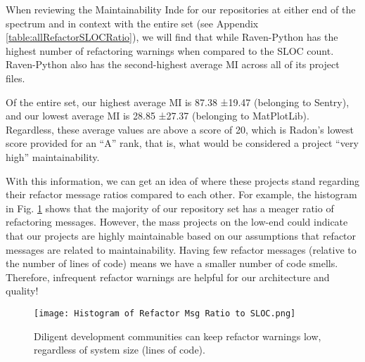 

When reviewing the Maintainability Inde for our repositories at either end of the spectrum and in context with the entire set (see Appendix \ref{table:allRefactorSLOCRatio}), we will find that while Raven-Python has the highest number of refactoring warnings when compared to the SLOC count. Raven-Python also has the second-highest average MI across all of its project files.

Of the entire set, our highest average MI is 87.38 ±19.47 (belonging to Sentry), and our lowest average MI is 28.85 ±27.37 (belonging to MatPlotLib). Regardless, these average values are above a score of 20, which is Radon's lowest score provided for an ``A'' rank, that is, what would be considered a project ``very high'' maintainability.

With this information, we can get an idea of where these projects stand regarding their refactor message ratios compared to each other. For example, the histogram in Fig. \ref{figHistogramRefactorRatio} shows that the majority of our repository set has a meager ratio of refactoring messages. However, the mass projects on the low-end could indicate that our projects are highly maintainable based on our assumptions that refactor messages are related to maintainability. Having few refactor messages (relative to the number of lines of code) means we have a smaller number of code smells. Therefore, infrequent refactor warnings are helpful for our architecture and quality!

\begin{figure}[ht]
  \centerline{
    \texttt{[image: Histogram of Refactor Msg Ratio to SLOC.png]}
  }
  \caption{Diligent development communities can keep refactor warnings low, regardless of system size (lines of code).}
  \label{figHistogramRefactorRatio}
\end{figure}

